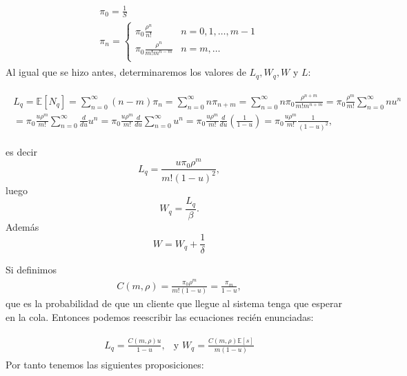 \documentclass{article}
\newcommand{\esp}{\mathbb{E}}
\numberwithin{equation}{section}
\begin{document}
\begin{eqnarray}
\begin{array}{l}
\pi_{0}=\frac{1}{S}\\
\pi_{n}=\left\{\begin{array}{cc}
\pi_{0}\frac{\rho^{n}}{n!} & n=0,1,\ldots,m-1\\
\pi_{0}\frac{\rho^{n}}{m!m^{n-m}}& n=m,\ldots\\
\end{array}\right.

\end{array}
\end{eqnarray}
Al igual que se hizo antes, determinaremos los valores de
$L_{q},W_{q},W$ y $L$:

\begin{eqnarray}
\begin{array}{l}
L_{q}=\esp\left[N_{q}\right]=\sum_{n=0}^{\infty}\left(n-m\right)\pi_{n}=\sum_{n=0}^{\infty}n\pi_{n+m}=\sum_{n=0}^{\infty}n\pi_{0}\frac{\rho^{n+m}}{m!m^{n+m}}=\pi_{0}\frac{\rho^{m}}{m!}\sum_{n=0}^{\infty}nu^{n}\\
=\pi_{0}\frac{u\rho^{m}}{m!}\sum_{n=0}^{\infty}\frac{d}{du}u^{n}=\pi_{0}\frac{u\rho^{m}}{m!}\frac{d}{du}\sum_{n=0}^{\infty}u^{n}=\pi_{0}\frac{u\rho^{m}}{m!}\frac{d}{du}\left(\frac{1}{1-u}\right)=\pi_{0}\frac{u\rho^{m}}{m!}\frac{1}{\left(1-u\right)^{2}},
\end{array}
\end{eqnarray}

es decir
\begin{equation}
L_{q}=\frac{u\pi_{0}\rho^{m}}{m!\left(1-u\right)^{2}},
\end{equation}
luego
\begin{equation}
W_{q}=\frac{L_{q}}{\beta}.
\end{equation}
Adem\'as
\begin{equation}
W=W_{q}+\frac{1}{\delta}
\end{equation}

Si definimos
\begin{eqnarray}
C\left(m,\rho\right)=\frac{\pi_{0}\rho^{m}}{m!\left(1-u\right)}=\frac{\pi_{m}}{1-u},
\end{eqnarray}
que es la probabilidad de que un cliente que llegue al sistema
tenga que esperar en la cola. Entonces podemos reescribir las
ecuaciones reci\'en enunciadas:

\begin{eqnarray}
\begin{array}{ll}
L_{q}=\frac{C\left(m,\rho\right)u}{1-u},&\textrm{y }
W_{q}=\frac{C\left(m,\rho\right)\esp\left[s\right]}{m\left(1-u\right)}
\end{array}
\end{eqnarray}
Por tanto tenemos las siguientes proposiciones:
\end{document}
